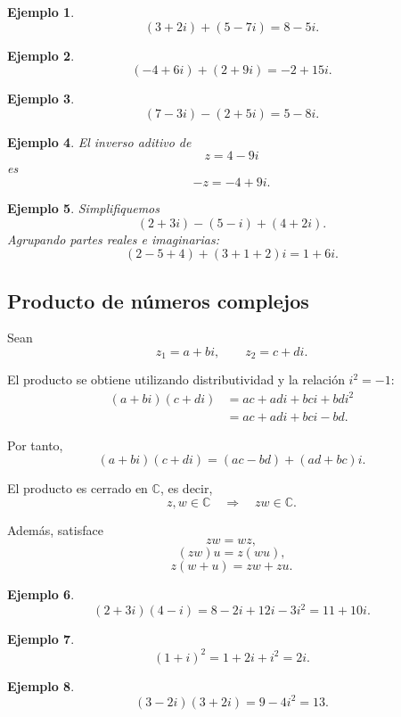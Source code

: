 \documentclass[12pt]{article}
\newtheorem{Ejem}{Ejemplo}
\begin{document}
\begin{Ejem}
\[
(3+2i)+(5-7i)=8-5i.
\]
\end{Ejem}

\begin{Ejem}
\[
(-4+6i)+(2+9i)=-2+15i.
\]
\end{Ejem}

\begin{Ejem}

\[
(7-3i)-(2+5i)
=
5-8i.
\]
\end{Ejem}

\begin{Ejem}
El inverso aditivo de
\[
z=4-9i
\]
es
\[
-z=-4+9i.
\]
\end{Ejem}

\begin{Ejem}
Simplifiquemos
\[
(2+3i)-(5-i)+(4+2i).
\]
Agrupando partes reales e imaginarias:
\[
(2-5+4)+(3+1+2)i
=
\boxed{1+6i}.
\]
\end{Ejem}


\subsection*{Producto de números complejos}

Sean
\[
z_1=a+bi,
\qquad
z_2=c+di.
\]

El producto se obtiene utilizando distributividad y la relación $i^2=-1$:
\begin{align*}
(a+bi)(c+di)
&=
ac+adi+bci+bdi^2\\
&=
ac+adi+bci-bd.
\end{align*}

Por tanto,
\[
\boxed{
(a+bi)(c+di)
=
(ac-bd)+(ad+bc)i.
}
\]

El producto es cerrado en $\mathbb{C}$, es decir,
\[
z,w\in\mathbb{C}
\quad\Longrightarrow\quad
zw\in\mathbb{C}.
\]

Además, satisface
\[
zw=wz,
\]
\[
(zw)u=z(wu),
\]
\[
z(w+u)=zw+zu.
\]

\begin{Ejem}
\[
(2+3i)(4-i)
=
8-2i+12i-3i^2
=
\boxed{11+10i}.
\]

\end{Ejem}

\begin{Ejem}
\[
(1+i)^2
=
1+2i+i^2
=
\boxed{2i}.
\]
\end{Ejem}

\begin{Ejem}
\[
(3-2i)(3+2i)
=
9-4i^2
=
\boxed{13}.
\]
\end{Ejem}
\end{document}
